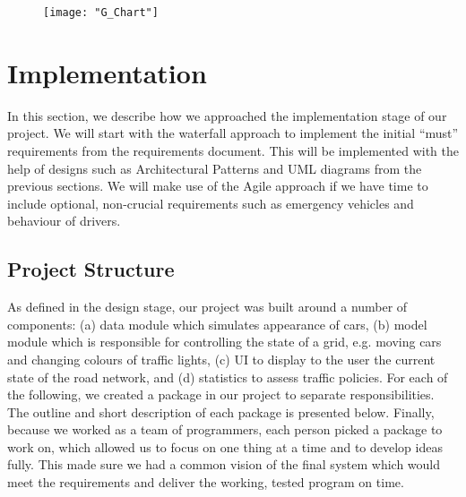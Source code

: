 \documentclass{article}
\begin{document}
	\begin{figure}
		\centering
		\texttt{[image: "G\_Chart"]}
        \caption{}
        \label{Gchart}
	\end{figure}
    
    
	
	
	\section{Implementation}
	In this section, we describe how we approached the implementation stage of our project. 
	We will start with the waterfall approach to implement the initial ``must'' requirements from the requirements document. This will be implemented with the help of designs such as Architectural Patterns and UML diagrams from the previous sections. We will make use of the Agile approach if we have time to include optional, non-crucial requirements such as emergency vehicles and behaviour of drivers. 
	
	
	\subsection{Project Structure}
	As defined in the design stage, our project was built around a number of components: (a) data module which simulates appearance of cars, (b) model module which is responsible for controlling the state of a grid, e.g. moving cars and changing colours of traffic lights, (c) UI to display to the user the current state of the road network, and (d) statistics to assess traffic policies. 
	For each of the following, we created a package in our project to separate responsibilities. 
	The outline and short description of each package is presented below. Finally, because we worked as a team of programmers, each person picked a package to work on, which allowed us to focus on one thing at a time and to develop ideas fully. This made sure we had a common vision of the final system which would meet the requirements and deliver the working, tested program on time. 
	
\end{document}
